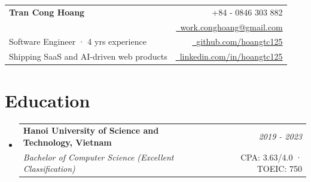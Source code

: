 \documentclass[a4paper,11pt]{article}
\makeatletter
\newcommand{\resumeSubheading}[4]{
\vspace{0.5mm}\item
    \begin{tabular*}{0.98\textwidth}[t]{l@{\extracolsep{\fill}}r}
        \textbf{#1} & \textit{\footnotesize{#4}} \\
        \textit{\footnotesize{#3}} &  \footnotesize{#2}\\
    \end{tabular*}
    \vspace{-2.4mm}
}
\newcommand{\resumeSubHeadingListStart}{\begin{itemize}[leftmargin=*,labelsep=0mm]}
\newcommand{\resumeSubHeadingListEnd}{\end{itemize}\vspace{2mm}}
\newcommand{\name}{Tran Cong Hoang} %
\newcommand{\course}{} %
\newcommand{\roll}{} %
\newcommand{\phone}{0846 303 882} %
\newcommand{\emaila}{work.conghoang@gmail.com} %
\newcommand{\emailb}{} %
\makeatother
\begin{document}
\selectfont


\parbox{\dimexpr\linewidth\relax}{
\begin{tabularx}{\linewidth}{L r} \\
  \textbf{\Large \name} & {\raisebox{0.0\height}{\footnotesize \faPhone}\ +84 - \phone}\\
  \course & \href{mailto:\emaila}{\raisebox{0.0\height}{\footnotesize \faEnvelope}\ {\emaila}} \\
  {Software Engineer · 4 yrs experience} &  \href{https://github.com/hoangtc125}{\raisebox{0.0\height}{\footnotesize \faGithub}\ {github.com/hoangtc125}} \\
  {Shipping SaaS and AI-driven web products} & \href{https://www.linkedin.com/in/hoangtc125}{\raisebox{0.0\height}{\footnotesize \faLinkedin}\ {linkedin.com/in/hoangtc125}}
\end{tabularx}
}




\section{\textbf{Education}}
  \resumeSubHeadingListStart
    \resumeSubheading
      {Hanoi University of Science and Technology, Vietnam}{CPA: 3.63/4.0 · TOEIC: 750}
      {Bachelor of Computer Science (Excellent Classification)}{2019 - 2023}
  \resumeSubHeadingListEnd
\vspace{-5.5mm}
%



\end{document}
